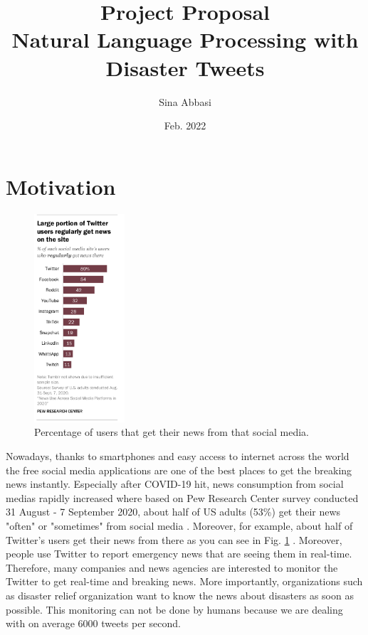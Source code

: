 \documentclass[12pt]{extarticle}
\title{Project Proposal \\
Natural Language Processing with Disaster Tweets
}
\author{Sina Abbasi}
\date{Feb. 2022}
\begin{document}
\maketitle


\section*{Motivation}

\begin{figure}
    \begin{center}
    \includegraphics[width=0.3\textwidth,height=0.6\textwidth]{twitterfig1.png}
    \end{center}
    \caption{Percentage of users that get their news from that social media.}
    \label{fig:twitter}
\end{figure}

Nowadays, thanks to smartphones and easy access to internet across the world the free social media applications are one of the best places to get the breaking news instantly. Especially after COVID-19 hit, news consumption from social medias rapidly increased where based on Pew Research Center survey conducted 31 August - 7 September 2020, about half of US adults (53\%) get their news "often" or "sometimes" from social media \cite{shearer2021news}. Moreover, for example, about half of Twitter's users get their news from there as you can see in Fig. \ref{fig:twitter} \cite{shearer2021news}. Moreover, people use Twitter to report emergency news that are seeing them in real-time. Therefore, many companies and news agencies are interested to monitor the Twitter to get real-time and breaking news. More importantly, organizations such as disaster relief organization want to know the news about disasters as soon as possible. This monitoring can not be done by humans because we are dealing with on average 6000 tweets per second.\\
\end{document}
